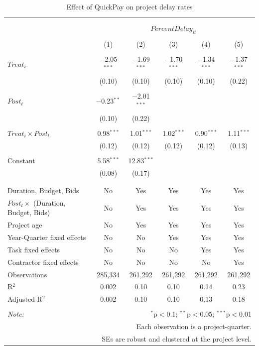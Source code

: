 \documentclass[
]{article}
\begin{document}
\begin{table}[H] \centering 
  \caption{Effect of QuickPay on project delay rates} 
  \label{} 
\small 
\begin{tabular}{@{\extracolsep{-2pt}}lccccc} 
\\[-1.8ex]\hline 
\hline \\[-1.8ex] 
\\[-1.8ex] & \multicolumn{5}{c}{$PercentDelay_{it}$} \\ 
\\[-1.8ex] & (1) & (2) & (3) & (4) & (5)\\ 
\hline \\[-1.8ex] 
 $Treat_i$ & $-$2.05$^{***}$ & $-$1.69$^{***}$ & $-$1.70$^{***}$ & $-$1.34$^{***}$ & $-$1.37$^{***}$ \\ 
  & (0.10) & (0.10) & (0.10) & (0.10) & (0.22) \\ 
  & & & & & \\ 
 $Post_t$ & $-$0.23$^{**}$ & $-$2.01$^{***}$ &  &  &  \\ 
  & (0.10) & (0.22) &  &  &  \\ 
  & & & & & \\ 
 $Treat_i \times Post_t$ & 0.98$^{***}$ & 1.01$^{***}$ & 1.02$^{***}$ & 0.90$^{***}$ & 1.11$^{***}$ \\ 
  & (0.12) & (0.12) & (0.12) & (0.12) & (0.13) \\ 
  & & & & & \\ 
 Constant & 5.58$^{***}$ & 12.83$^{***}$ &  &  &  \\ 
  & (0.08) & (0.17) &  &  &  \\ 
  & & & & & \\ 
\hline \\[-1.8ex] 
Duration, Budget, Bids & No & Yes & Yes & Yes & Yes \\ 
$Post_t \times$  (Duration, Budget, Bids) & No & Yes & Yes & Yes & Yes \\ 
Project age & No & Yes & Yes & Yes & Yes \\ 
Year-Quarter fixed effects & No & No & Yes & Yes & Yes \\ 
Task fixed effects & No & No & No & Yes & Yes \\ 
Contractor fixed effects & No & No & No & No & Yes \\ 
Observations & 285,334 & 261,292 & 261,292 & 261,292 & 261,292 \\ 
R$^{2}$ & 0.002 & 0.10 & 0.10 & 0.14 & 0.23 \\ 
Adjusted R$^{2}$ & 0.002 & 0.10 & 0.10 & 0.13 & 0.18 \\ 
\hline 
\hline \\[-1.8ex] 
\textit{Note:}  & \multicolumn{5}{r}{$^{*}$p$<$0.1; $^{**}$p$<$0.05; $^{***}$p$<$0.01} \\ 
 & \multicolumn{5}{r}{Each observation is a project-quarter.} \\ 
 & \multicolumn{5}{r}{SEs are robust and clustered at the project level.} \\ 
\end{tabular} 
\end{table}
\end{document}
